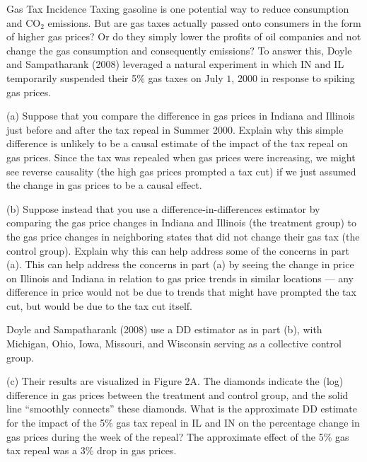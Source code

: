 \documentclass[8pt]{extarticle}
\begin{document}
  \begin{problem}{Gas Tax Incidence}
    Taxing gasoline is one potential way to reduce consumption and CO$_2$ emissions. But are gas taxes actually passed onto consumers in the form of higher gas prices? Or do they simply lower the profits of oil companies and not change the gas consumption and consequently emissions? To answer this, Doyle and Sampatharank (2008) leveraged a natural experiment in which IN and IL temporarily suspended their 5\% gas taxes on July $1$, 2000 in response to spiking gas prices.
    \tcblower
    \begin{problem}{(a)}
      Suppose that you compare the difference in gas prices in Indiana and Illinois just before and after the tax repeal in Summer 2000. Explain why this simple difference is unlikely to be a causal estimate of the impact of the tax repeal on gas prices.
      \tcblower
      Since the tax was repealed when gas prices were increasing, we might see reverse causality (the high gas prices prompted a tax cut) if we just assumed the change in gas prices to be a causal effect.
    \end{problem}
    \begin{problem}{(b)}
      Suppose instead that you use a difference-in-differences estimator by comparing the gas price changes in Indiana and Illinois (the treatment group) to the gas price changes in neighboring states that did not change their gas tax (the control group). Explain why this can help address some of the concerns in part (a).
      \tcblower
      This can help address the concerns in part (a) by seeing the change in price on Illinois and Indiana in relation to gas price trends in similar locations --- any difference in price would not be due to trends that might have prompted the tax cut, but would be due to the tax cut itself.
    \end{problem}
    Doyle and Sampatharank (2008) use a DD estimator as in part (b), with Michigan, Ohio, Iowa, Missouri, and Wisconsin serving as a collective control group.
    \begin{problem}{(c)}
      Their results are visualized in Figure 2A. The diamonds indicate the (log) difference in gas prices between the treatment and control group, and the solid line ``smoothly connects'' these diamonds. What is the approximate DD estimate for the impact of the 5\% gas tax repeal in IL and IN on the percentage change in gas prices during the week of the repeal?
      \tcblower
      The approximate effect of the 5\% gas tax repeal was a 3\% drop in gas prices.

\end{problem}
\end{problem}
\end{document}
